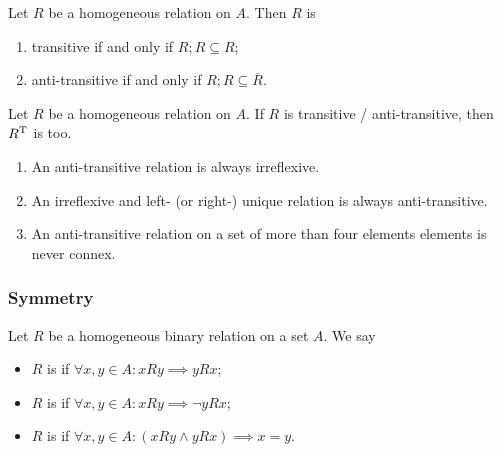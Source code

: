 \begin{lemma}
Let $R$ be a homogeneous relation on $A$. Then $R$ is
\begin{enumerate}
\item transitive \textup{if and only if} $R; R \subseteq R$;
\item anti-transitive \textup{if and only if} $R; R \subseteq \overline{R}$.
\end{enumerate}
\end{lemma}

\begin{lemma}
Let $R$ be a homogeneous relation on $A$. If $R$ is transitive / anti-transitive, then $R^{\mathrm{T}}$ is too.
\end{lemma}


\begin{lemma}
\begin{enumerate}
\item An anti-transitive relation is always irreflexive.
\item An irreflexive and left- (or right-) unique relation is always anti-transitive.
\item An anti-transitive relation on a set of more than four elements elements is never connex.
\end{enumerate}
\end{lemma}

\subsubsection{Symmetry}
\begin{definition}
Let $R$ be a homogeneous binary relation on a set $A$. We say
\begin{itemize}
\item $R$ is  if $\forall x,y\in A: xRy \implies yRx$;
\item $R$ is  if $\forall x,y\in A: xRy \implies \neg yRx$;
\item $R$ is  if $\forall x,y\in A: (xRy\land yRx) \implies x=y$.
\end{itemize}
\end{definition}

